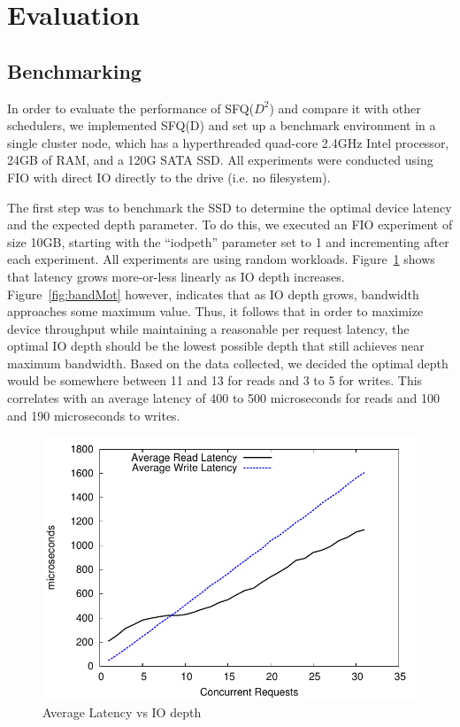 \section{Evaluation}

\subsection{Benchmarking}

In order to evaluate the performance of SFQ($D^2$) and compare it with
other schedulers, we implemented SFQ(D) and set up a benchmark
environment in a single cluster node, which has a hyperthreaded
quad-core 2.4GHz Intel processor, 24GB of RAM, and a 120G SATA
SSD. All experiments were conducted using FIO with direct IO directly
to the drive (i.e. no filesystem).

The first step was to benchmark the SSD to determine the optimal
device latency and the expected depth parameter. To do this, we
executed an FIO experiment of size 10GB, starting with the ``iodpeth''
parameter set to 1 and incrementing after each experiment. All
experiments are using random workloads. Figure~\ref{fig:latMot} shows
that latency grows more-or-less linearly as IO depth
increases. Figure~\ref{fig:bandMot} however, indicates that as IO
depth grows, bandwidth approaches some maximum value. Thus, it follows
that in order to maximize device throughput while maintaining a
reasonable per request latency, the optimal IO depth should be the
lowest possible depth that still achieves near maximum
bandwidth. Based on the data collected, we decided the optimal depth
would be somewhere between 11 and 13 for reads and 3 to 5 for
writes. This correlates with an average latency of 400 to 500
microseconds for reads and 100 and 190 microseconds to writes.

\begin{figure}[t]
  \centering \includegraphics[width=\linewidth]{../../graphs/noop/latency_motivation.pdf}
  \caption{Average Latency vs IO depth}
  \label{fig:latMot}
\end{figure} 

